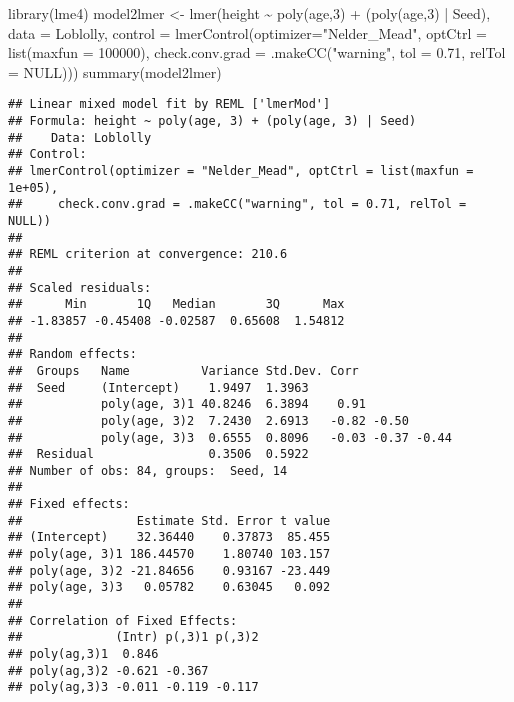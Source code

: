 \documentclass[
]{book}
\newenvironment{Shaded}{\begin{snugshade}}{\end{snugshade}}
\newcommand{\AttributeTok}[1]{\textcolor[rgb]{0.77,0.63,0.00}{#1}}
\newcommand{\ConstantTok}[1]{\textcolor[rgb]{0.00,0.00,0.00}{#1}}
\newcommand{\DecValTok}[1]{\textcolor[rgb]{0.00,0.00,0.81}{#1}}
\newcommand{\FloatTok}[1]{\textcolor[rgb]{0.00,0.00,0.81}{#1}}
\newcommand{\FunctionTok}[1]{\textcolor[rgb]{0.00,0.00,0.00}{#1}}
\newcommand{\NormalTok}[1]{#1}
\newcommand{\OtherTok}[1]{\textcolor[rgb]{0.56,0.35,0.01}{#1}}
\newcommand{\SpecialCharTok}[1]{\textcolor[rgb]{0.00,0.00,0.00}{#1}}
\newcommand{\StringTok}[1]{\textcolor[rgb]{0.31,0.60,0.02}{#1}}
\begin{document}
\begin{Shaded}
\begin{Highlighting}[]
\FunctionTok{library}\NormalTok{(lme4)}
\NormalTok{model2lmer }\OtherTok{\textless{}{-}} \FunctionTok{lmer}\NormalTok{(height }\SpecialCharTok{\textasciitilde{}} \FunctionTok{poly}\NormalTok{(age,}\DecValTok{3}\NormalTok{) }\SpecialCharTok{+}\NormalTok{ (}\FunctionTok{poly}\NormalTok{(age,}\DecValTok{3}\NormalTok{) }\SpecialCharTok{|}\NormalTok{ Seed), }\AttributeTok{data =}\NormalTok{ Loblolly, }\AttributeTok{control =} \FunctionTok{lmerControl}\NormalTok{(}\AttributeTok{optimizer=}\StringTok{"Nelder\_Mead"}\NormalTok{, }\AttributeTok{optCtrl =} \FunctionTok{list}\NormalTok{(}\AttributeTok{maxfun =} \DecValTok{100000}\NormalTok{), }\AttributeTok{check.conv.grad =} \FunctionTok{.makeCC}\NormalTok{(}\StringTok{"warning"}\NormalTok{, }\AttributeTok{tol =} \FloatTok{0.71}\NormalTok{, }\AttributeTok{relTol =} \ConstantTok{NULL}\NormalTok{)))}
\FunctionTok{summary}\NormalTok{(model2lmer)}
\end{Highlighting}
\end{Shaded}

\begin{verbatim}
## Linear mixed model fit by REML ['lmerMod']
## Formula: height ~ poly(age, 3) + (poly(age, 3) | Seed)
##    Data: Loblolly
## Control: 
## lmerControl(optimizer = "Nelder_Mead", optCtrl = list(maxfun = 1e+05),  
##     check.conv.grad = .makeCC("warning", tol = 0.71, relTol = NULL))
## 
## REML criterion at convergence: 210.6
## 
## Scaled residuals: 
##      Min       1Q   Median       3Q      Max 
## -1.83857 -0.45408 -0.02587  0.65608  1.54812 
## 
## Random effects:
##  Groups   Name          Variance Std.Dev. Corr             
##  Seed     (Intercept)    1.9497  1.3963                    
##           poly(age, 3)1 40.8246  6.3894    0.91            
##           poly(age, 3)2  7.2430  2.6913   -0.82 -0.50      
##           poly(age, 3)3  0.6555  0.8096   -0.03 -0.37 -0.44
##  Residual                0.3506  0.5922                    
## Number of obs: 84, groups:  Seed, 14
## 
## Fixed effects:
##                Estimate Std. Error t value
## (Intercept)    32.36440    0.37873  85.455
## poly(age, 3)1 186.44570    1.80740 103.157
## poly(age, 3)2 -21.84656    0.93167 -23.449
## poly(age, 3)3   0.05782    0.63045   0.092
## 
## Correlation of Fixed Effects:
##             (Intr) p(,3)1 p(,3)2
## poly(ag,3)1  0.846              
## poly(ag,3)2 -0.621 -0.367       
## poly(ag,3)3 -0.011 -0.119 -0.117
\end{verbatim}
\end{document}
